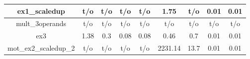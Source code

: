 \begin{table}[t]
\begin{tabular}{|c|c|c|c|c|c|c|c|c|}
ex1\_scaledup         & t/o         & t/o           & t/o         & t/o                  & 1.75      & t/o          & 0.01       & 0.01                 \\ \hline
mult\_3operands       & t/o         & t/o           & t/o         & t/o                  & t/o       & t/o          & t/o        & t/o                  \\ \hline
ex3                   & 1.38        & 0.3           & 0.08        & 0.08                 & 0.46      & 0.7          & 0.01       & 0.01                 \\ \hline
mot\_ex2\_scaledup\_2 & t/o         & t/o           & t/o         & t/o                  & 2231.14   & 13.7         & 0.01       & 0.01                 \\ \hline
\end{tabular}
\end{table}

